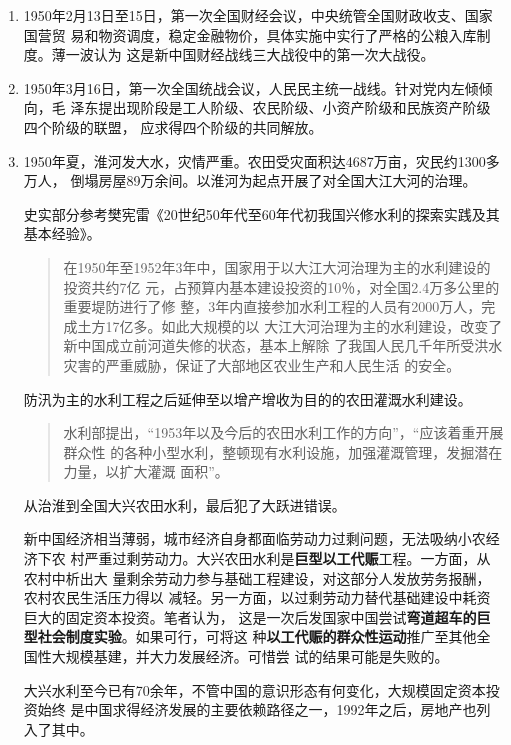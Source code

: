 \begin{enumerate}

\item 1950年2月13日至15日，第一次全国财经会议，中央统管全国财政收支、国家国营贸
  易和物资调度，稳定金融物价，具体实施中实行了严格的公粮入库制度。薄一波认为
  这是新中国财经战线三大战役中的第一次大战役。

\item 1950年3月16日，第一次全国统战会议，人民民主统一战线。针对党内左倾倾向，毛
  泽东提出现阶段是工人阶级、农民阶级、小资产阶级和民族资产阶级四个阶级的联盟，
  应求得四个阶级的共同解放。

\item 1950年夏，淮河发大水，灾情严重。农田受灾面积达4687万亩，灾民约1300多万人，
  倒塌房屋89万余间。以淮河为起点开展了对全国大江大河的治理。

  史实部分参考樊宪雷《20世纪50年代至60年代初我国兴修水利的探索实践及其基本经验》。
  \begin{quotation}
    在1950年至1952年3年中，国家用于以大江大河治理为主的水利建设的投资共约7亿
    元，占预算内基本建设投资的10％，对全国2.4万多公里的重要堤防进行了修
    整，3年内直接参加水利工程的人员有2000万人，完成土方17亿多。如此大规模的以
    大江大河治理为主的水利建设，改变了新中国成立前河道失修的状态，基本上解除
    了我国人民几千年所受洪水灾害的严重威胁，保证了大部地区农业生产和人民生活
    的安全。
  \end{quotation}

  防汛为主的水利工程之后延伸至以增产增收为目的的农田灌溉水利建设。
  \begin{quotation}
    水利部提出，“1953年以及今后的农田水利工作的方向”，“应该着重开展群众性
    的各种小型水利，整顿现有水利设施，加强灌溉管理，发掘潜在力量，以扩大灌溉
    面积”。
  \end{quotation}
  从治淮到全国大兴农田水利，最后犯了大跃进错误。

  新中国经济相当薄弱，城市经济自身都面临劳动力过剩问题，无法吸纳小农经济下农
  村严重过剩劳动力。大兴农田水利是\textbf{巨型以工代赈}工程。一方面，从农村中析出大
  量剩余劳动力参与基础工程建设，对这部分人发放劳务报酬，农村农民生活压力得以
  减轻。另一方面，以过剩劳动力替代基础建设中耗资巨大的固定资本投资。笔者认为，
  这是一次后发国家中国尝试\textbf{弯道超车的巨型社会制度实验}。如果可行，可将这
  种\textbf{以工代赈的群众性运动}推广至其他全国性大规模基建，并大力发展经济。可惜尝
  试的结果可能是失败的。

  大兴水利至今已有70余年，不管中国的意识形态有何变化，大规模固定资本投资始终
  是中国求得经济发展的主要依赖路径之一，1992年之后，房地产也列入了其中。


\end{enumerate}
